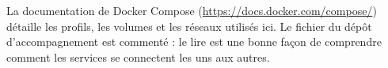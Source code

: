 \begin{plusloin}
La documentation de Docker Compose (\url{https://docs.docker.com/compose/}) détaille les profils, les volumes et les réseaux utilisés ici. Le fichier  du dépôt d'accompagnement est commenté : le lire est une bonne façon de comprendre comment les services se connectent les uns aux autres.
\end{plusloin}
